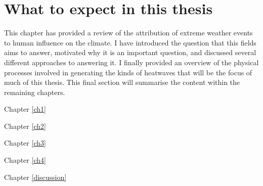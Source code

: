 \section{What to expect in this thesis}

  This chapter has provided a review of the attribution of extreme weather events to human influence on the climate. I have introduced the question that this fields aims to answer, motivated why it is an important question, and discussed several different approaches to answering it. I finally provided an overview of the physical processes involved in generating the kinds of heatwaves that will be the focus of much of this thesis. This final section will summarise the content within the remaining chapters.

  Chapter \ref{ch1}

  Chapter \ref{ch2}

  Chapter \ref{ch3}

  Chapter \ref{ch4}

  Chapter \ref{discussion}
